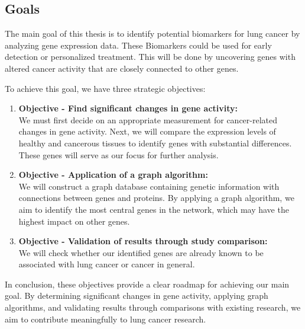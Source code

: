 \subsection{Goals} \label{subsec:goals}

The main goal of this thesis is to identify potential biomarkers for lung cancer by analyzing gene expression data.
These Biomarkers could be used for early detection or personalized treatment.
This will be done by uncovering genes with altered cancer activity that are closely connected to other genes.

To achieve this goal, we have three strategic objectives:
\begin{enumerate}
    \item \textbf{Objective - Find significant changes in gene activity:}\\
    We must first decide on an appropriate measurement for cancer-related changes in gene activity.
    Next, we will compare the expression levels of healthy and cancerous tissues to identify genes with substantial differences.
    These genes will serve as our focus for further analysis.
    \label{obj:delta_tpm}

    \item \textbf{Objective - Application of a graph algorithm:}\\
    We will construct a graph database containing genetic information with connections between genes and proteins.
    By applying a graph algorithm, we aim to identify the most central genes in the network,
    which may have the highest impact on other genes.
    \label{obj:graph_algorithm}

    \item \textbf{Objective - Validation of results through study comparison:}\\
    We will check whether our identified genes are already known to be associated with lung cancer or cancer in general.
    \label{obj:validation}
\end{enumerate}

In conclusion, these objectives provide a clear roadmap for achieving our main goal.
By determining significant changes in gene activity, applying graph algorithms,
and validating results through comparisons with existing research,
we aim to contribute meaningfully to lung cancer research.

